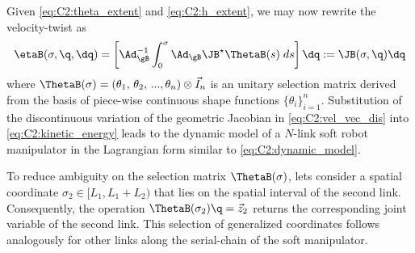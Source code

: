 Given \eqref{eq:C2:theta_extent} and \eqref{eq:C2:h_extent}, we may now rewrite the velocity-twist as
%
\begin{equation} \etaB(\sigma,\q,\dq) = \left[\Ad_{\gB}^{-1}
\int_0^\sigma \Ad_{\gB} \JB^\star \ThetaB(s) \; ds \right]\dq := \JB(\sigma,\q) \dq
\label{eq:C2:vel_vec_dis} \end{equation}
%
where $\ThetaB(\sigma) = (\theta_1,\,\theta_2,\,...,\theta_n) \otimes \vec{I}_n$ is an unitary selection matrix derived from the basis of piece-wise continuous shape functions $\!\{\theta_i\}_{i=1}^n$. Substitution of the discontinuous variation of the geometric Jacobian in \eqref{eq:C2:vel_vec_dis} into
\eqref{eq:C2:kinetic_energy} leads to the dynamic model of a $N$-link soft robot manipulator in the
Lagrangian form similar to \eqref{eq:C2:dynamic_model}.
%
\begin{example}
To reduce ambiguity on the selection matrix $\ThetaB(\sigma)$, lets consider a spatial coordinate $\sigma_2 \in [L_1,L_1+L_2)$ that lies on the spatial interval of the second link. Consequently, the operation $\ThetaB(\sigma_2) \q = \vec{z}_2$ returns the corresponding joint variable of the second link. This selection of generalized coordinates follows analogously for other links along the serial-chain of the soft manipulator.
\end{example}
%
